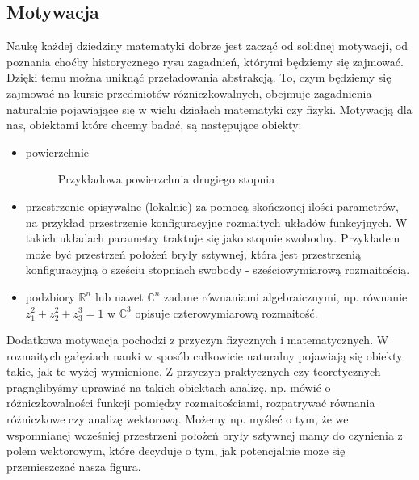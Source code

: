 \subsection{Motywacja}
Naukę każdej dziedziny matematyki dobrze jest zacząć od solidnej motywacji, od poznania choćby historycznego rysu zagadnień, którymi będziemy się zajmować. Dzięki temu można uniknąć przeładowania abstrakcją. To, czym będziemy się zajmować na kursie przedmiotów różniczkowalnych, obejmuje zagadnienia naturalnie pojawiające się w wielu działach matematyki czy fizyki. Motywacją dla nas, obiektami które chcemy badać, są następujące obiekty:
\begin{itemize}
	\item powierzchnie
		\begin{figure}[ht]
			    \centering
				\caption{Przykładowa powierzchnia drugiego stopnia}
				\label{fig:torus}
		\end{figure}
	\item przestrzenie opisywalne (lokalnie) za pomocą skończonej ilości parametrów, na przykład przestrzenie konfiguracyjne rozmaitych układów funkcyjnych. W takich układach parametry traktuje się jako stopnie swobodny. Przykładem może być przestrzeń położeń bryły sztywnej, która jest przestrzenią konfiguracyjną o sześciu stopniach swobody - sześciowymiarową rozmaitością.

	\item podzbiory $\mathbb{R}^n$ lub nawet $\mathbb{C}^n$ zadane równaniami algebraicznymi, np. równanie $z_1^2 + z_2^2 + z_3^3 = 1$ w $\mathbb{C}^3$ opisuje czterowymiarową rozmaitość.
\end{itemize}
Dodatkowa motywacja pochodzi z przyczyn fizycznych i matematycznych. W rozmaitych gałęziach nauki w sposób całkowicie naturalny pojawiają się obiekty takie, jak te wyżej wymienione. Z przyczyn praktycznych czy teoretycznych pragnęlibyśmy uprawiać na takich obiektach analizę, np. mówić o różniczkowalności funkcji pomiędzy rozmaitościami, rozpatrywać równania różniczkowe czy analizę wektorową. Możemy np. myśleć o tym, że we wspomnianej wcześniej przestrzeni położeń bryły sztywnej mamy do czynienia z polem wektorowym, które decyduje o tym, jak potencjalnie może się przemieszczać nasza figura.

